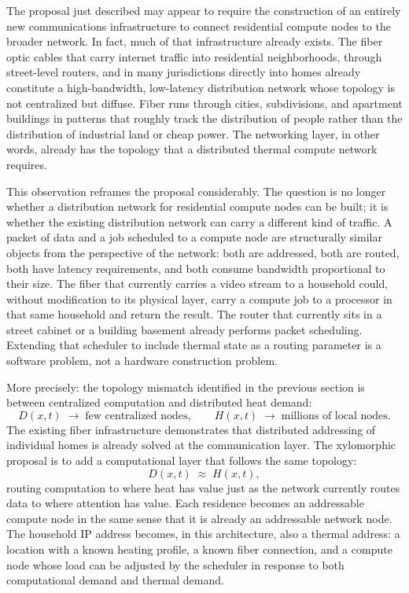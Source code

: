 \documentclass[12pt, oneside]{article}
\begin{document}
The proposal just described may appear to require the construction of an entirely new communications infrastructure to connect residential compute nodes to the broader network. In fact, much of that infrastructure already exists. The fiber optic cables that carry internet traffic into residential neighborhoods, through street-level routers, and in many jurisdictions directly into homes already constitute a high-bandwidth, low-latency distribution network whose topology is not centralized but diffuse. Fiber runs through cities, subdivisions, and apartment buildings in patterns that roughly track the distribution of people rather than the distribution of industrial land or cheap power. The networking layer, in other words, already has the topology that a distributed thermal compute network requires.

This observation reframes the proposal considerably. The question is no longer whether a distribution network for residential compute nodes can be built; it is whether the existing distribution network can carry a different kind of traffic. A packet of data and a job scheduled to a compute node are structurally similar objects from the perspective of the network: both are addressed, both are routed, both have latency requirements, and both consume bandwidth proportional to their size. The fiber that currently carries a video stream to a household could, without modification to its physical layer, carry a compute job to a processor in that same household and return the result. The router that currently sits in a street cabinet or a building basement already performs packet scheduling. Extending that scheduler to include thermal state as a routing parameter is a software problem, not a hardware construction problem.

More precisely: the topology mismatch identified in the previous section is between centralized computation and distributed heat demand:
\[
D(x,t) \;\rightarrow\; \text{few centralized nodes}, \qquad H(x,t) \;\rightarrow\; \text{millions of local nodes}.
\]
The existing fiber infrastructure demonstrates that distributed addressing of individual homes is already solved at the communication layer. The xylomorphic proposal is to add a computational layer that follows the same topology:
\[
D(x,t) \;\approx\; H(x,t),
\]
routing computation to where heat has value just as the network currently routes data to where attention has value. Each residence becomes an addressable compute node in the same sense that it is already an addressable network node. The household IP address becomes, in this architecture, also a thermal address: a location with a known heating profile, a known fiber connection, and a compute node whose load can be adjusted by the scheduler in response to both computational demand and thermal demand.
\end{document}
